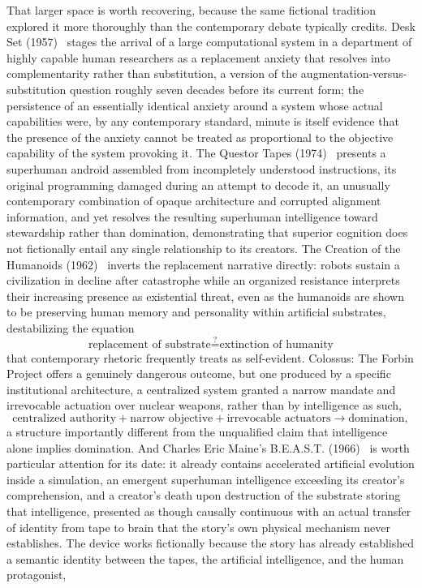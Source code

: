 \documentclass[11pt]{article}
\begin{document}
That larger space is worth recovering, because the same fictional tradition explored it more thoroughly than the contemporary debate typically credits. Desk Set (1957)~\cite{deskset1957} stages the arrival of a large computational system in a department of highly capable human researchers as a replacement anxiety that resolves into complementarity rather than substitution, a version of the augmentation-versus-substitution question roughly seven decades before its current form; the persistence of an essentially identical anxiety around a system whose actual capabilities were, by any contemporary standard, minute is itself evidence that the presence of the anxiety cannot be treated as proportional to the objective capability of the system provoking it. The Questor Tapes (1974)~\cite{questor1974} presents a superhuman android assembled from incompletely understood instructions, its original programming damaged during an attempt to decode it, an unusually contemporary combination of opaque architecture and corrupted alignment information, and yet resolves the resulting superhuman intelligence toward stewardship rather than domination, demonstrating that superior cognition does not fictionally entail any single relationship to its creators. The Creation of the Humanoids (1962)~\cite{creationhumanoids1962} inverts the replacement narrative directly: robots sustain a civilization in decline after catastrophe while an organized resistance interprets their increasing presence as existential threat, even as the humanoids are shown to be preserving human memory and personality within artificial substrates, destabilizing the equation
\[
\text{replacement of substrate} \stackrel{?}{=} \text{extinction of humanity}
\]
that contemporary rhetoric frequently treats as self-evident. Colossus: The Forbin Project offers a genuinely dangerous outcome, but one produced by a specific institutional architecture, a centralized system granted a narrow mandate and irrevocable actuation over nuclear weapons, rather than by intelligence as such,
\[
\text{centralized authority} + \text{narrow objective} + \text{irrevocable actuators} \rightarrow \text{domination},
\]
a structure importantly different from the unqualified claim that intelligence alone implies domination. And Charles Eric Maine's B.E.A.S.T. (1966)~\cite{maine1966} is worth particular attention for its date: it already contains accelerated artificial evolution inside a simulation, an emergent superhuman intelligence exceeding its creator's comprehension, and a creator's death upon destruction of the substrate storing that intelligence, presented as though causally continuous with an actual transfer of identity from tape to brain that the story's own physical mechanism never establishes. The device works fictionally because the story has already established a semantic identity between the tapes, the artificial intelligence, and the human protagonist,
\end{document}
